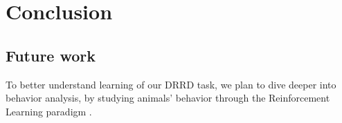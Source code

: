 \chapter{Conclusion}
\label{chap:conclusion}


\section{Future work}
\label{sec:future}

To better understand learning of our DRRD task, we plan to dive deeper into behavior analysis, by studying animals' behavior through the Reinforcement Learning paradigm \cite{niv2016reinforcement}.